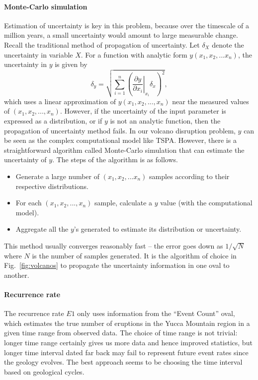 \documentclass[nofootinbib,preprint,aps]{revtex4-1}
\begin{document}
        \paragraph{Monte-Carlo simulation}
        Estimation of uncertainty is key in this problem, because over the timescale of a million years,
        a small uncertainty would amount to large measurable change. Recall the traditional method of
        propagation of uncertainty. Let $\delta_X$ denote the uncertainty in variable $X$. For a function
        with analytic form $y(x_1,x_2,...x_n)$, the uncertainty in $y$ is given by
        \begin{equation}
            \delta_y = \sqrt{\sum\limits_{i=1}^n \left(\left.\frac{\partial y}{\partial x_i}
            \right\rvert_{x_i} \delta_x\right)^2},
        \end{equation}
        which uses a linear approximation of $y(x_1,x_2,...,x_n)$ near the measured values of
        $(x_1,x_2,...,x_n)$.
        However, if the uncertainty of the input parameter is expressed as a distribution, or if $y$ is
        not an analytic function, then the propagation of uncertainty method fails. In our volcano disruption
        problem, $y$ can be seen as the complex computational model like TSPA. However, there is a
        straightforward algorithm called Monte-Carlo simulation that can estimate the uncertainty of $y$.
        The steps of the algorithm is as follows.
        \begin{itemize}
            \item Generate a large number of $(x_1,x_2,...x_n)$ samples according to their respective distributions.
            \item For each $(x_1,x_2,...,x_n)$ sample, calculate a $y$ value (with the computational model).
            \item Aggregate all the $y$'s generated to estimate its distribution or uncertainty.
        \end{itemize}
        This method usually converges reasonably fast -- the error goes down as $1/\sqrt{N}$ where $N$ is the number
        of samples generated. It is the algorithm of choice in Fig.~\ref{fig:volcanos} to
        propagate the uncertainty information in one oval to another.
        \paragraph{Recurrence rate} The recurrence rate $E1$ only uses information from the ``Event Count''
        oval, which estimates the true number of eruptions in the Yucca Mountain region in a given time range
        from observed data. The choice of time range is not trivial: longer time range certainly gives us
        more data and hence improved statistics, but longer time interval dated far back may fail to represent
        future event rates since the geology evolves. The best approach seems to be choosing the time interval
        based on geological cycles.
\end{document}
